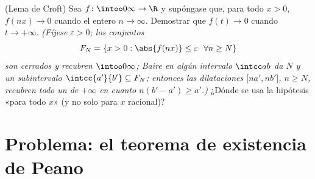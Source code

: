 \begin{exercise}[$\star\star\star$]\label{exo:b3:complete:12}
(Lema de Croft) Sea $f\colon\intoo0\infty\to\R$
 y supóngase que, para todo
$x > 0$, $f(nx) \to 0$ cuando el entero $n \to \infty$. Demostrar que
$f(t) \to 0$ cuando $t \to
+\infty$. \emph{(Fíjese $\varepsilon > 0$; los conjuntos
\[
F_N = \{x > 0 : \abs{f(nx)} \leq \varepsilon\ \ \forall n
\geq N\}
\]
son cerrados y recubren $\intoo0\infty$; Baire en algún intervalo
$\intcc ab$ da $N$ y un subintervalo $\intcc{a'}{b'}
\subseteq F_N$; entonces las dilataciones $\bigl[na', nb'\bigr]$, $n
\geq N$, recubren todo un  de
$+\infty$ en cuanto $n(b' - a') \geq a'$.)} ¿Dónde se usa la hipótesis
«para todo $x$» (y no solo para $x$ racional)?
\end{exercise}

\section{Problema: el teorema de existencia de Peano}

